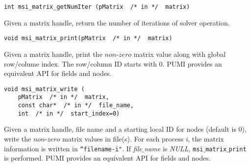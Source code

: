 \begin{verbatim}
int msi_matrix_getNumIter (pMatrix  /* in */  matrix)
\end{verbatim}\vspace{-.5cm}\hspace{1cm}
Given a matrix handle, return the number of iterations of solver operation.

\begin{verbatim}
void msi_matrix_print(pMatrix  /* in */  matrix)
\end{verbatim}\vspace{-.5cm}\hspace{1cm}
Given a matrix handle, print the $non$-$zero$ matrix value along with global row/colume index. The row/column ID starts with 0. PUMI provides an equivalent API for fields and nodes.

\begin{verbatim}
void msi_matrix_write (
    pMatrix  /* in */  matrix, 
    const char*  /* in */  file_name, 
    int  /* in */  start_index=0)
\end{verbatim}\vspace{-.5cm}\hspace{1cm}
Given a matrix handle, file name and a starting local ID for nodes (default is 0), write the $non$-$zero$ matrix values in file(s). For each process \textit{i}, the matrix information is written in \texttt{``filename-i"}. If \textit{file$\_$name} is \textit{NULL}, \texttt{msi$\_$matrix$\_$print} is performed.
PUMI provides an equivalent API for fields and nodes. 
